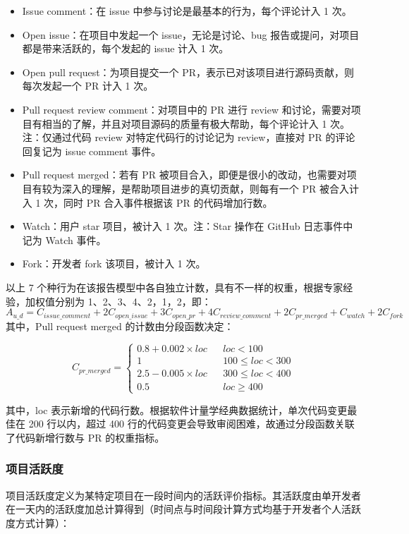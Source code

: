 \begin{itemize}
    \item Issue comment：在 issue 中参与讨论是最基本的行为，每个评论计入 1 次。
    \item Open issue：在项目中发起一个 issue，无论是讨论、bug 报告或提问，对项目都是带来活跃的，每个发起的 issue 计入 1 次。
    \item Open pull request：为项目提交一个 PR，表示已对该项目进行源码贡献，则每次发起一个 PR 计入 1 次。
    \item Pull request review comment：对项目中的 PR 进行 review 和讨论，需要对项目有相当的了解，并且对项目源码的质量有极大帮助，每个评论计入 1 次。\\
          注：仅通过代码 review 对特定代码行的讨论记为 review，直接对 PR 的评论回复记为 issue comment 事件。
    \item Pull request merged：若有 PR 被项目合入，即便是很小的改动，也需要对项目有较为深入的理解，是帮助项目进步的真切贡献，则每有一个 PR 被合入计入 1 次，同时 PR 合入事件根据该 PR 的代码增加行数。
    \item Watch：用户 star 项目，被计入 1 次。注：Star 操作在 GitHub 日志事件中记为 Watch 事件。
    \item Fork：开发者 fork 该项目，被计入 1 次。
\end{itemize}
以上 7 个种行为在该报告模型中各自独立计数，具有不一样的权重，根据专家经验，加权值分别为 1、2、3、4、2，1，2，即：
$$
 A_{u\_d}=C_{issue\_comment}+2{C}_{open\_issue}+3{C}_{open\_pr}+4{C}_{review\_comment}+2{C}_{pr\_merged}+{C}_{watch}+2{C}_{fork} 
$$
其中，Pull request merged 的计数由分段函数决定：

$$ C_{pr\_merged}=\left\{
    \begin{array}{rcl}
        0.8+0.002 \times loc &  & {loc < 100}          \\
        1                    &  & {100 \leq loc < 300} \\
        2.5-0.005 \times loc &  & {300 \leq loc < 400} \\
        0.5                  &  & {loc \geq 400}
    \end{array} \right.
$$

其中，loc 表示新增的代码行数。根据软件计量学经典数据统计，单次代码变更最佳在 200 行以内，超过 400 行的代码变更会导致审阅困难，故通过分段函数关联了代码新增行数与 PR 的权重指标。

\subsubsection{项目活跃度}
\par 项目活跃度定义为某特定项目在一段时间内的活跃评价指标。其活跃度由单开发者在一天内的活跃度加总计算得到（时间点与时间段计算方式均基于开发者个人活跃度方式计算）：

